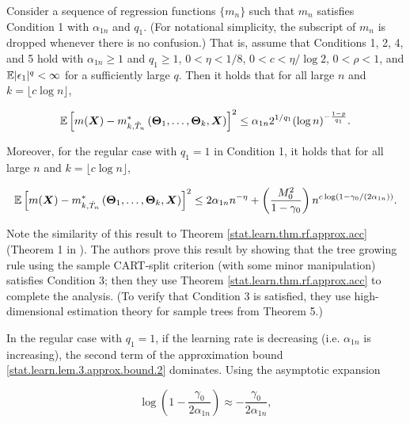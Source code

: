 \begin{lemma}

Consider a sequence of regression functions \(\{m_n\}\) such that \(m_n\) satisfies Condition 1 with \(\alpha_{1n}\) and \(q_1\). (For notational simplicity, the subscript of \(m_n\) is dropped whenever there is no confusion.) That is, assume that Conditions 1, 2, 4, and 5 hold with \(\alpha_{1n} \geq 1\) and \(q_1 \geq 1\), \(0 < \eta < 1/8\), \(0 < c < \eta/\log 2\), \(0 < \rho < 1\), and \(\mathbb{E} |\epsilon_1|^q < \infty\) for a sufficiently large \(q\). Then it holds that for all large \(n\) and \(k = \lfloor c \log n \rfloor\),

\[
\mathbb{E} \left[ m(\boldsymbol{X}) - m_{k, \hat{T}_n}^*\left( \boldsymbol{\Theta}_1, \ldots, \boldsymbol{\Theta}_k, \boldsymbol{X} \right)  \right]^2 \leq \alpha_{1n}2^{1/q_1} (\log n)^{-\frac{1-p}{q_1}}.
\]

Moreover, for the regular case with \(q_1 = 1\) in Condition 1, it holds that for all large \(n\) and \(k = \lfloor c \log n \rfloor\),

\begin{equation}\label{stat.learn.lem.3.approx.bound.2}
\mathbb{E} \left[ m(\boldsymbol{X}) - m_{k, \hat{T}_n}^*\left( \boldsymbol{\Theta}_1, \ldots, \boldsymbol{\Theta}_k, \boldsymbol{X} \right)  \right]^2 \leq 2\alpha_{1n}n^{-\eta} + \left( \frac{M_0^2}{1 - \gamma_0} \right) n^{c \log \left( 1 - \gamma_0/(2 \alpha_{1n})\right)} .
\end{equation}

\end{lemma}

Note the similarity of this result to Theorem \ref{stat.learn.thm.rf.approx.acc} (Theorem 1 in \citet{Chi2020}). The authors prove this result by showing that the tree growing rule using the sample CART-split criterion (with some minor manipulation) satisfies Condition 3; then they use Theorem \ref{stat.learn.thm.rf.approx.acc} to complete the analysis. (To verify that Condition 3 is satisfied, they use high-dimensional estimation theory for sample trees from Theorem 5.)

In the regular case with \(q_1 = 1\), if the learning rate is decreasing (i.e. \(\alpha_{1n}\) is increasing), the second term of the approximation bound \eqref{stat.learn.lem.3.approx.bound.2} dominates. Using the asymptotic expansion

\[
\log \left( 1 - \frac{\gamma_0}{2 \alpha_{1n}} \right) \approx - \frac{\gamma_0}{2 \alpha_{1n}},
\]

